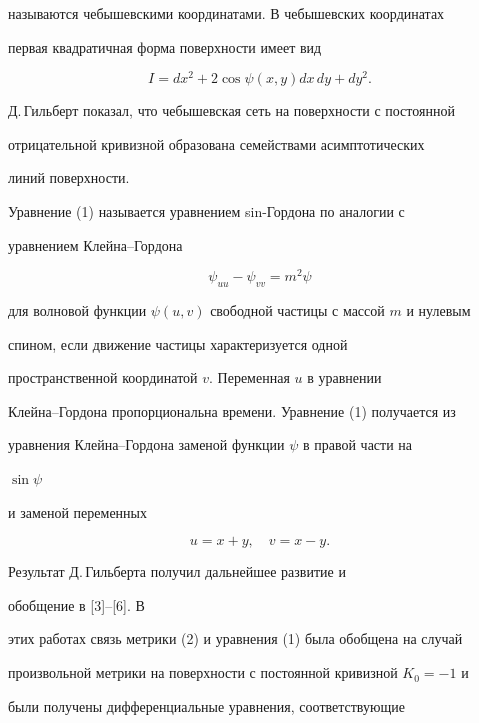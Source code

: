 называются чебышевскими координатами. В чебышевских координатах 


первая квадратичная форма поверхности имеет вид 


\begin{equation} 


I=dx^2+2\cos\psi(x,y)dx\,dy+dy^2. 


\end{equation} 


Д.\,Гильберт показал, что чебышевская сеть на поверхности с постоянной 


отрицательной кривизной образована семействами асимптотических 


линий поверхности. 


 


Уравнение (1) называется уравнением sin-Гордона по аналогии с 


уравнением Клейна--Гордона 


$$ 


\psi_{u u}-\psi_{v v}=m^2\psi 


$$ 


для волновой функции $\psi(u,v)$ свободной частицы с массой $m$ и нулевым 


спином, если движение частицы характеризуется одной 


пространственной координатой $v$. Переменная $u$ в уравнении 


Клейна--Гордона пропорциональна времени. Уравнение (1) получается из 


уравнения Клейна--Гордона заменой функции $\psi$ в правой части на 


$\sin\psi$ 


и заменой переменных 


\begin{equation} 


u=x+y,\quad v=x-y. 


\end{equation} 


 


Результат Д.\,Гильберта получил дальнейшее развитие и 


обобщение в [3]--[6]. В 


этих работах связь метрики (2) и уравнения (1) была обобщена на случай 


произвольной метрики на поверхности с постоянной кривизной $K_0=-1$ и 


были получены дифференциальные уравнения, соответствующие 


